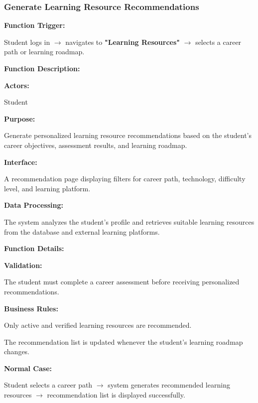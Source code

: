 \subsubsection{Generate Learning Resource Recommendations}

\textbf{Function Trigger:}

Student logs in $\rightarrow$ navigates to \textbf{"Learning Resources"} $\rightarrow$ selects a career path or learning roadmap.

\vspace{0.3cm}

\textbf{Function Description:}

\textbf{Actors:}

Student

\vspace{0.2cm}

\textbf{Purpose:}

Generate personalized learning resource recommendations based on the student's career objectives, assessment results, and learning roadmap.

\vspace{0.2cm}

\textbf{Interface:}

A recommendation page displaying filters for career path, technology, difficulty level, and learning platform.

\vspace{0.2cm}

\textbf{Data Processing:}

The system analyzes the student's profile and retrieves suitable learning resources from the database and external learning platforms.

\vspace{0.3cm}

\textbf{Function Details:}

\textbf{Validation:}

The student must complete a career assessment before receiving personalized recommendations.

\textbf{Business Rules:}

Only active and verified learning resources are recommended.

The recommendation list is updated whenever the student's learning roadmap changes.

\textbf{Normal Case:}

Student selects a career path $\rightarrow$ system generates recommended learning resources $\rightarrow$ recommendation list is displayed successfully.

